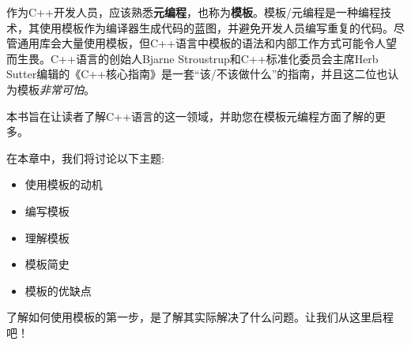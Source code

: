 作为C++开发人员，应该熟悉\textbf{元编程}，也称为\textbf{模板}。模板/元编程是一种编程技术，其使用模板作为编译器生成代码的蓝图，并避免开发人员编写重复的代码。尽管通用库会大量使用模板，但C++语言中模板的语法和内部工作方式可能令人望而生畏。C++语言的创始人Bjarne Stroustrup和C++标准化委员会主席Herb Sutter编辑的《C++核心指南》是一套“该/不该做什么”的指南，并且这二位也认为模板\textit{非常可怕}。

本书旨在让读者了解C++语言的这一领域，并助您在模板元编程方面了解的更多。

在本章中，我们将讨论以下主题:

\begin{itemize}
\item
使用模板的动机

\item
编写模板

\item
理解模板

\item
模板简史

\item
模板的优缺点
\end{itemize}

了解如何使用模板的第一步，是了解其实际解决了什么问题。让我们从这里启程吧！








